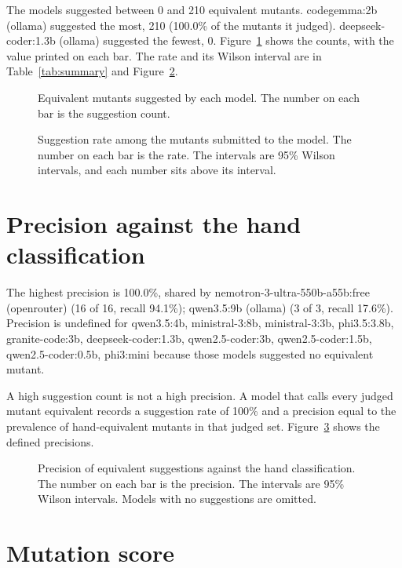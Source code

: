 \documentclass[11pt]{article}
\begin{document}
The models suggested between 0 and 210 equivalent mutants. codegemma:2b (ollama) suggested the most, 210 (100.0\% of the mutants it judged). deepseek-coder:1.3b (ollama) suggested the fewest, 0. Figure~\ref{fig:suggestions} shows the counts, with the value printed on each bar. The rate and its Wilson interval are in Table~\ref{tab:summary} and Figure~\ref{fig:rate}.

\begin{figure}[ht]
\centering

\caption{Equivalent mutants suggested by each model. The number on each bar is the suggestion count.}
\label{fig:suggestions}
\end{figure}

\begin{figure}[ht]
\centering

\caption{Suggestion rate among the mutants submitted to the model. The number on each bar is the rate. The intervals are 95\% Wilson intervals, and each number sits above its interval.}
\label{fig:rate}
\end{figure}

\section{Precision against the hand classification}

The highest precision is 100.0\%, shared by nemotron-3-ultra-550b-a55b:free (openrouter) (16 of 16, recall 94.1\%); qwen3.5:9b (ollama) (3 of 3, recall 17.6\%). Precision is undefined for qwen3.5:4b, ministral-3:8b, ministral-3:3b, phi3.5:3.8b, granite-code:3b, deepseek-coder:1.3b, qwen2.5-coder:3b, qwen2.5-coder:1.5b, qwen2.5-coder:0.5b, phi3:mini because those models suggested no equivalent mutant.

A high suggestion count is not a high precision. A model that calls every judged mutant equivalent records a suggestion rate of 100\% and a precision equal to the prevalence of hand-equivalent mutants in that judged set. Figure~\ref{fig:precision} shows the defined precisions.

\begin{figure}[ht]
\centering

\caption{Precision of equivalent suggestions against the hand classification. The number on each bar is the precision. The intervals are 95\% Wilson intervals. Models with no suggestions are omitted.}
\label{fig:precision}
\end{figure}

\section{Mutation score}
\end{document}
